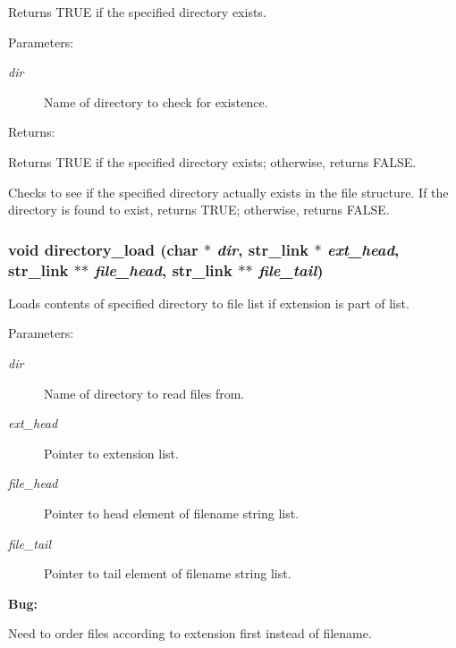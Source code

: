 Returns TRUE if the specified directory exists.

\begin{Desc}
\item[Parameters: ]\par
\begin{description}
\item[{\em 
dir}]Name of directory to check for existence. \end{description}
\end{Desc}
\begin{Desc}
\item[Returns: ]\par
Returns TRUE if the specified directory exists; otherwise, returns FALSE.\end{Desc}
Checks to see if the specified directory actually exists in the file structure. If the directory is found to exist, returns TRUE; otherwise, returns FALSE. 
\subsubsection{\setlength{\rightskip}{0pt plus 5cm}void directory\_\-load (char $\ast$ {\em dir}, {\bf str\_\-link} $\ast$ {\em ext\_\-head}, {\bf str\_\-link} $\ast$$\ast$ {\em file\_\-head}, {\bf str\_\-link} $\ast$$\ast$ {\em file\_\-tail})}\label{util_8h_a6}


Loads contents of specified directory to file list if extension is part of list.

\begin{Desc}
\item[Parameters: ]\par
\begin{description}
\item[{\em 
dir}]Name of directory to read files from. \item[{\em 
ext\_\-head}]Pointer to extension list. \item[{\em 
file\_\-head}]Pointer to head element of filename string list. \item[{\em 
file\_\-tail}]Pointer to tail element of filename string list.\end{description}
\end{Desc}


\begin{Desc}
\item[{\bf Bug: }]\par
Need to order files according to extension first instead of filename.\end{Desc}


